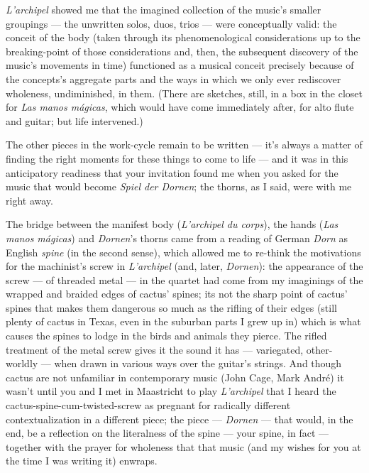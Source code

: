\documentclass[11pt]{article}
\begin{document}
\textit{L'archipel} showed me that the imagined collection of the music's smaller groupings --- the unwritten solos, duos, trios --- were conceptually valid: the conceit of the body (taken through its phenomenological considerations up to the breaking-point of those considerations and, then, the subsequent discovery of the music's movements in time) functioned as a musical conceit precisely because of the concepts's aggregate parts and the ways in which we only ever rediscover wholeness, undiminished, in them. (There are sketches, still, in a box in the closet for \textit{Las manos m\'{a}gicas}, which would have come immediately after, for alto flute and guitar; but life intervened.)

The other pieces in the work-cycle remain to be written --- it's always a matter of finding the right moments for these things to come to life --- and it was in this anticipatory readiness that your invitation found me when you asked for the music that would become \textit{Spiel der Dornen}; the thorns, as I said, were with me right away.

The bridge between the manifest body (\textit{L'archipel du corps}), the hands (\textit{Las manos m\'{a}gicas}) and \textit{Dornen}'s thorns came from a reading of German \textit{Dorn} as English \textit{spine} (in the second sense), which allowed me to re-think the motivations for the machinist's screw in \textit{L'archipel} (and, later, \textit{Dornen}): the appearance of the screw --- of threaded metal --- in the quartet had come from my imaginings of the wrapped and braided edges of cactus' spines; its not the sharp point of cactus' spines that makes them dangerous so much as the rifling of their edges (still plenty of cactus in Texas, even in the suburban parts I grew up in) which is what causes the spines to lodge in the birds and animals they pierce. The rifled treatment of the metal screw gives it the sound it has --- variegated, other-worldly --- when drawn in various ways over the guitar's strings. And though cactus are not unfamiliar in contemporary music (John Cage, Mark Andr\'{e}) it wasn't until you and I met in Maastricht to play \textit{L'archipel} that I heard the cactus-spine-cum-twisted-screw as pregnant for radically different contextualization in a different piece; the piece --- \textit{Dornen} --- that would, in the end, be a reflection on the literalness of the spine --- your spine, in fact --- together with the prayer for wholeness that that music (and my wishes for you at the time I was writing it) enwraps.
\end{document}
